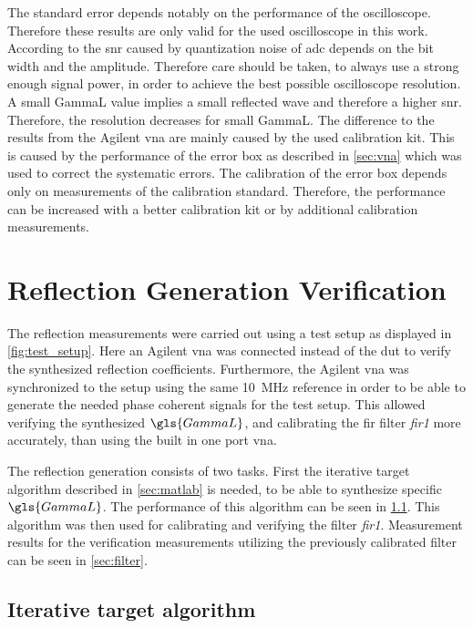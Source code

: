\documentclass[12pt,a4paper,parskip=full,abstract=true,BCOR=12mm,twoside,open=right]{scrreprt}
\def\device#1{\textit{#1}}
\begin{document}
The standard error depends notably on the performance of the oscilloscope. Therefore these
results are only valid for the used oscilloscope in this work. According to \cite{Oppenheim} the
\gls{snr} caused by quantization noise of \gls{adc} depends on the bit width and
the amplitude. Therefore care should be taken, to always use a strong enough signal power,
in order to achieve the best possible oscilloscope resolution. A small \gls{GammaL}
value implies a small reflected wave and therefore a higher \gls{snr}. Therefore, the
resolution decreases for small \gls{GammaL}. The difference to the results from the
Agilent \gls{vna} are mainly caused by the used calibration kit. This is caused by
the performance of the error box as described in \cref{sec:vna} which was used
to correct the systematic errors. The calibration of the error box depends
only on measurements of the calibration standard. Therefore, the performance can
be increased with a better calibration kit or by additional calibration measurements.


\section{Reflection Generation Verification}
\label{sec:reflection}

The reflection measurements were carried out using a test setup as displayed in \cref{fig:test_setup}.
Here an Agilent \gls{vna} was connected instead of the \gls{dut} to verify the synthesized reflection
coefficients. Furthermore, the Agilent \gls{vna} was synchronized to the setup using the same
\SI{10}{\mega\hertz} reference in order to be able to generate the needed phase coherent
signals for the test setup. This allowed verifying the synthesized $\gls{GammaL}$, and
calibrating the \gls{fir} filter \device{fir1} more accurately, than using the built
in one port \gls{vna}.

The reflection generation consists of two tasks. First the iterative target algorithm
described in \cref{sec:matlab} is needed, to be able to synthesize specific $\gls{GammaL}$.
The performance of this algorithm can be seen in \cref{sec:iterative}. This
algorithm was then used for calibrating and verifying the filter \device{fir1}. Measurement
results for the verification measurements utilizing the previously calibrated filter can be seen in \cref{sec:filter}.

\subsection{Iterative target algorithm}
\label{sec:iterative}
\end{document}
